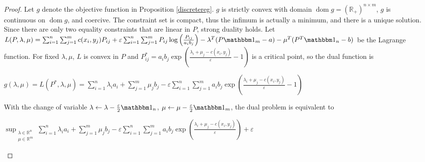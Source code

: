 \documentclass[12pt]{report}
\theoremstyle{definition}
\theoremstyle{remark}
\DeclareMathOperator{\dom}{dom}
\begin{document}
\begin{proof}
	Let $g$ denote the objective function in Proposition \ref{discretereg}. $g$ is strictly convex with domain $\dom g=(\mathbb R_+)^{n\times m}$, $g$ is continuous on $\dom g$, and coercive. The constraint set is compact, thus the infimum is actually a minimum, and there is a unique solution.\\
	Since there are only two equality constraints that are linear in $P$, strong duality holds. Let \\$L(P,\lambda,\mu)=\sum_{i=1}^n\sum_{j=1}^m c(x_i,y_j)P_{ij} + \varepsilon \sum_{i=1}^n\sum_{j=1}^m P_{ij}\log\left(\frac{P_{ij}}{a_i b_j} \right) - \lambda^T(P\mathbbm 1_m-a) - \mu^T(P^T \mathbbm 1_n -b)$ be the Lagrange function. For fixed $\lambda, \mu$, $L$ is convex in $P$ and $P_{ij}^* =a_i b_j \exp\left(\frac{\lambda_i+\mu_j-c(x_i,y_j)}{\varepsilon}-1 \right)$ is a critical point, so the dual function is \begin{center}
		$g(\lambda, \mu) = L(P^*,\lambda,\mu) = \sum_{i=1}^n \lambda_i a_i+\sum_{j=1}^m \mu_j b_j - \varepsilon \sum_{i=1}^n\sum_{j=1}^m a_i b_j \exp\left(\frac{\lambda_i+\mu_j-c(x_i,y_j)}{\varepsilon}-1 \right)$
	\end{center}
		With the change of variable $\lambda \leftarrow \lambda-\frac{\varepsilon}2 \mathbbm 1_n$, $\mu \leftarrow \mu-\frac{\varepsilon}2 \mathbbm 1_m$, the dual problem is equivalent to
	\begin{center}
		$\displaystyle \sup_{\substack{\lambda\in \mathbb R^n\\ \mu\in \mathbb R^m}} \sum_{i=1}^n \lambda_i a_i+\sum_{j=1}^m \mu_j b_j - \varepsilon \sum_{i=1}^n\sum_{j=1}^m a_i b_j \exp\left(\frac{\lambda_i+\mu_j-c(x_i,y_j)}{\varepsilon}\right) + \varepsilon$
	\end{center}
\end{proof}
\end{document}
